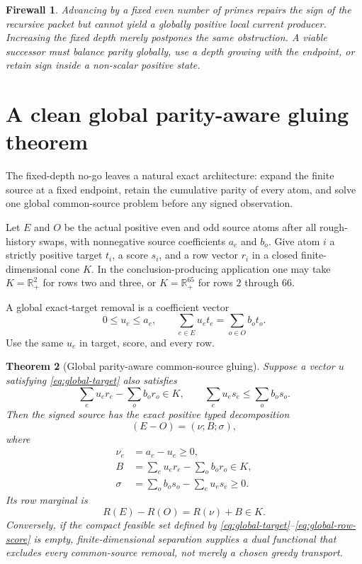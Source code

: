 \documentclass[11pt]{article}
\newtheorem{theorem}{Theorem}[section]
\newtheorem{firewall}[theorem]{Firewall}
\newcommand{\R}{\mathbb R}
\newcommand{\1}{\mathbf 1}
\begin{document}
\begin{firewall}
Advancing by a fixed even number of primes repairs the sign of the recursive
packet but cannot yield a globally positive local current producer.  Increasing
the fixed depth merely postpones the same obstruction.  A viable successor must
balance parity globally, use a depth growing with the endpoint, or retain sign
inside a non-scalar positive state.
\end{firewall}

\section{A clean global parity-aware gluing theorem}

The fixed-depth no-go leaves a natural exact architecture: expand the finite
source at a fixed endpoint, retain the cumulative parity of every atom, and
solve one global common-source problem before any signed observation.

Let $E$ and $O$ be the actual positive even and odd source atoms after all
rough-history swaps, with nonnegative source coefficients $a_e$ and $b_o$.
Give atom $i$ a strictly positive target $t_i$, a score $s_i$, and a row vector
$r_i$ in a closed finite-dimensional cone $K$.  In the
conclusion-producing application one may take $K=\R_+^2$ for rows two and three,
or $K=\R_+^{65}$ for rows $2$ through $66$.

A global exact-target removal is a coefficient vector
\begin{equation}
 0\le u_e\le a_e,
 \qquad
 \sum_{e\in E}u_et_e=\sum_{o\in O}b_ot_o.
 \label{eq:global-target}
\end{equation}
Use the same $u_e$ in target, score, and every row.

\begin{theorem}[Global parity-aware common-source gluing]
\label{thm:global-gluing}
Suppose a vector $u$ satisfying \eqref{eq:global-target} also satisfies
\begin{equation}
 \sum_eu_er_e-\sum_ob_or_o\in K,
 \qquad
 \sum_eu_es_e\le\sum_ob_os_o.
 \label{eq:global-row-score}
\end{equation}
Then the signed source has the exact positive typed decomposition
\begin{equation}
 (E-O)=(\nu;B;\sigma),
 \label{eq:global-typed}
\end{equation}
where
\begin{align}
 \nu_e&=a_e-u_e\ge0,\\
 B&=\sum_eu_er_e-\sum_ob_or_o\in K,\\
 \sigma&=\sum_ob_os_o-\sum_eu_es_e\ge0.
\end{align}
Its row marginal is
\begin{equation}
 R(E)-R(O)=R(\nu)+B\in K.
 \label{eq:global-positive-row}
\end{equation}
Conversely, if the compact feasible set defined by
\eqref{eq:global-target}--\eqref{eq:global-row-score} is empty, finite-dimensional
separation supplies a dual functional that excludes every common-source
removal, not merely a chosen greedy transport.
\end{theorem}
\end{document}
